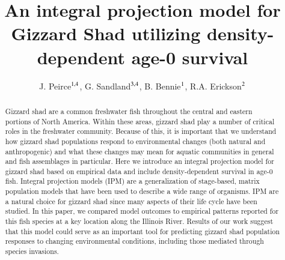 \documentclass[preprint,review,12pt,authoryear]{elsarticle}
\begin{document}
\linenumbers
\begin{frontmatter}


\title{An integral projection model for Gizzard Shad utilizing density-dependent age-0 survival}

\author{ J. Peirce$^{\rm 1,4}$,  G.  Sandland$^{\rm 3,4}$, B. Bennie$^{\rm 1}$, R.A. Erickson$^{\rm 2}$}
\address{
${\rm 1}$ University of Wisconsin - La Crosse, Mathematics \& Statistics Department\\ 
${\rm 2}$ U.S.G.S. Upper Mississippi Environmental Science Center\\ 
${\rm 3}$ University of Wisconsin - La Crosse, Biology Department\\
${\rm 4}$ River Studies Center} 

\begin{abstract}
Gizzard shad are a common freshwater fish throughout the central and eastern portions of North America. 
Within these areas, gizzard shad play a number of critical roles in the freshwater community. 
Because of this, it is important that we understand how gizzard shad populations respond to environmental changes (both natural and anthropogenic) and what these changes may mean for aquatic communities in general and fish assemblages in particular. 
Here we introduce an integral projection model for gizzard shad based on empirical data and include density-dependent survival in age-0 fish. 
Integral projection models (IPM) are a generalization of stage-based, matrix population models that have been used to describe a wide range of organisms. 
IPM are a natural choice for gizzard shad since many aspects of their life cycle have been studied. 
In this paper, we compared model outcomes to empirical patterns reported for this fish species at a key location along the Illinois River. 
Results of our work suggest that this model could serve as an important tool for predicting gizzard shad population responses to changing environmental conditions, including those mediated through species invasions.
\end{abstract}

\begin{graphicalabstract}
\begin{figure}
\label{llife_cycle}
    \begin{center}
\begin{tikzpicture}[->,>=stealth',shorten >=1pt,auto,node distance=3cm,
  thick,
  main node/.style={rectangle,draw},
  box/.style = {draw=gray, very thick,
                            minimum height=11mm, text width=11mm, 
                            align=center},]
                              

\end{tikzpicture}
\end{center}
\end{figure}
\end{graphicalabstract}
\end{frontmatter}
\end{document}

